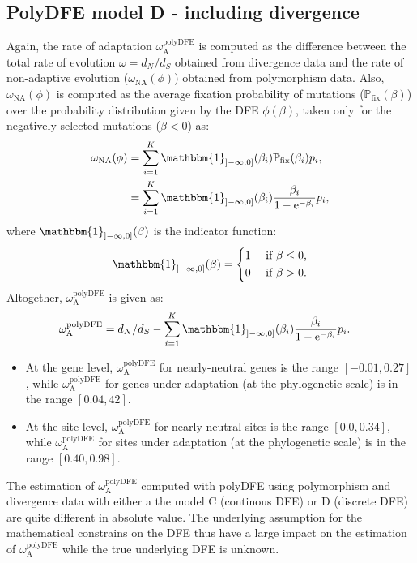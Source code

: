 \documentclass{article}
\newcommand{\e}{\mathrm{e}}
\newcommand{\dn}{d_N}
\newcommand{\ds}{d_S}
\newcommand{\dnds}{\dn / \ds}
\newcommand{\rateApop}{\omega_{\mathrm{A}}}
\newcommand{\proba}{\mathbb{P}}
\newcommand{\pfix}{\proba_{\mathrm{fix}}}
\newcommand{\Spop}{\beta}
\begin{document}
    \subsection{PolyDFE model D - including divergence}
    Again, the rate of adaptation $\rateApop^{\mathrm{polyDFE}}$ is computed as the difference between the total rate of evolution $\omega=\dnds$ obtained from divergence data and the rate of non-adaptive evolution ($\omega_{\mathrm{NA}}(\phi)$) obtained from polymorphism data.
    Also, $\omega_{\mathrm{NA}}(\phi)$ is computed as the average fixation probability of mutations ($\pfix (\Spop)$) over the probability distribution given by the DFE $\phi (\Spop)$, taken only for the negatively selected mutations ($\Spop < 0$) as:
    \begin{align*}
        \omega_{\mathrm{NA}}(\phi) &= \sum_{i=1}^{K} \mathbbm{1}_{]-\infty, 0]}(\Spop_i) \pfix (\Spop_i) p_i,  \\
        &= \sum_{i=1}^{K} \mathbbm{1}_{]-\infty, 0]}(\Spop_i) \frac{\Spop_i}{1 - \e^{-\Spop_i}} p_i,
    \end{align*}
    where $\mathbbm{1}_{]-\infty, 0]}(\Spop)$ is the indicator function:
    \begin{equation*}
        \mathbbm{1}_{]-\infty, 0]}(\Spop) =
        \begin{dcases}
            1 & \text{ if $\Spop \leq 0$,} \\
            0 & \text{ if $\Spop > 0$.} \\
        \end{dcases}
    \end{equation*}
    Altogether, $\rateApop^{\mathrm{polyDFE}}$ is given as:
    \begin{align*}
        \rateApop^{\mathrm{polyDFE}} &= \dnds - \sum_{i=1}^{K} \mathbbm{1}_{]-\infty, 0]}(\Spop_i) \frac{\Spop_i}{1 - \e^{-\Spop_i}} p_i.
    \end{align*}
    

    \begin{itemize}
        \item At the gene level, $\rateApop^{\mathrm{polyDFE}}$ for nearly-neutral genes is the range $[-0.01,0.27]$, while $\rateApop^{\mathrm{polyDFE}}$ for genes under adaptation (at the phylogenetic scale) is in the range $[0.04,42]$.
        \item At the site level, $\rateApop^{\mathrm{polyDFE}}$ for nearly-neutral sites is the range $[0.0,0.34]$, while $\rateApop^{\mathrm{polyDFE}}$ for sites under adaptation (at the phylogenetic scale) is in the range $[0.40,0.98]$.
    \end{itemize}
    The estimation of $\rateApop^{\mathrm{polyDFE}}$ computed with polyDFE using polymorphism and divergence data with either a the model C (continous DFE) or D (discrete DFE) are quite different in absolute value.
    The underlying assumption for the mathematical constrains on the DFE thus have a large impact on the estimation of $\rateApop^{\mathrm{polyDFE}}$ while the true underlying
    DFE is unknown.

    \pagebreak

    \printbibliography
\end{document}
